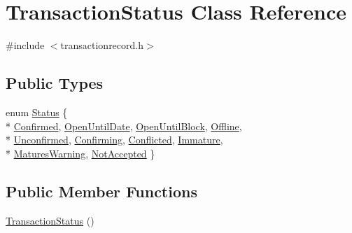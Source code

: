 \hypertarget{class_transaction_status}{}\section{Transaction\+Status Class Reference}
\label{class_transaction_status}


{\ttfamily \#include $<$transactionrecord.\+h$>$}

\subsection*{Public Types}
\begin{DoxyCompactItemize}
\item 
enum \hyperlink{class_transaction_status_aaa6cc19ca3509bbae72d0df1661f85cb}{Status} \{ \\*
\hyperlink{class_transaction_status_aaa6cc19ca3509bbae72d0df1661f85cba354f91f2bd2c4be35b366d02fe186e22}{Confirmed}, 
\hyperlink{class_transaction_status_aaa6cc19ca3509bbae72d0df1661f85cba4a0e6eac1d0db61fb9b1c96c6cbe592a}{Open\+Until\+Date}, 
\hyperlink{class_transaction_status_aaa6cc19ca3509bbae72d0df1661f85cbab91223e8b704793715b0e54637417a1c}{Open\+Until\+Block}, 
\hyperlink{class_transaction_status_aaa6cc19ca3509bbae72d0df1661f85cbaf8b9ab6fc1d08781bb94301e358171b6}{Offline}, 
\\*
\hyperlink{class_transaction_status_aaa6cc19ca3509bbae72d0df1661f85cba6aa37fcd802ffec2cc13db46dcc41c03}{Unconfirmed}, 
\hyperlink{class_transaction_status_aaa6cc19ca3509bbae72d0df1661f85cba75c0b79a4c38c5777cdae1a565d6ba5e}{Confirming}, 
\hyperlink{class_transaction_status_aaa6cc19ca3509bbae72d0df1661f85cbae06a462705a0126fda4b82e47915d812}{Conflicted}, 
\hyperlink{class_transaction_status_aaa6cc19ca3509bbae72d0df1661f85cba6b7a65301bf5a9eb371b34f2dcbd0e30}{Immature}, 
\\*
\hyperlink{class_transaction_status_aaa6cc19ca3509bbae72d0df1661f85cba25cc8866b321de53d71467d11bba19b7}{Matures\+Warning}, 
\hyperlink{class_transaction_status_aaa6cc19ca3509bbae72d0df1661f85cbaa00ed76c9186371bd649ffeec45d37e9}{Not\+Accepted}
 \}
\end{DoxyCompactItemize}
\subsection*{Public Member Functions}
\begin{DoxyCompactItemize}
\item 
\hyperlink{class_transaction_status_a92ca92106ef195594ae2b38e64ede8ce}{Transaction\+Status} ()
\end{DoxyCompactItemize}
